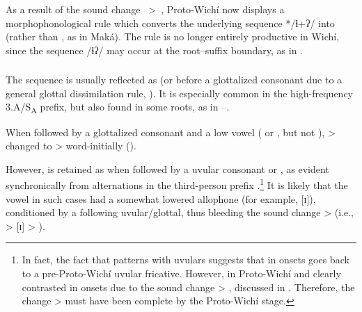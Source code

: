 As a result of the sound change ~>~, Proto-Wichí now displays a morphophonological rule which converts the underlying sequence */ɬ+ʔ/ into  (rather than , as in Maká). The rule is no longer entirely productive in Wichí, since the sequence /ɬʔ/ may occur at the root--suffix boundary, as in .

\subsubsection{}\label{wi-yi}

The sequence  is usually reflected as  (or  before a glottalized consonant due to a general glottal dissimilation rule, ). It is especially common in the high-frequency 3.A/S\textsubscript{A} prefix, but also found in some roots, as in --.

\begin{exe}
    \ex \cutdown
    \ex \tell
    \ex \notafraid
    \ex \dew \label{wi-ji-dew}
    \ex \water \label{wi-ji-water}
    \ex \mancw \label{wi-ji-mancw}
    \ex \redv
    \ex \takeaway
    \ex \torn
    \ex \sendv
    \ex \feed
    \ex \withstand
    \ex \killv
    \ex \feel
    \ex \flee
    \ex \wash
    \ex \sleep
    \ex \bathe
    \ex \cook
    \ex \throwcw
    \ex \spillcw
    \ex \throwv
    \ex \burnvt
\end{exe}

When followed by a glottalized consonant and a low vowel ( or , but not ),  >  changed to  >  word-initially ().

\begin{exe}
    \ex \jaguar
    \ex \treen
    \ex \vulture
\end{exe}

However,  is retained as  when followed by a uvular consonant or , as evident synchronically from alternations in the third-person prefix \citep[241–242]{VN14}.\footnote{\label{prepwjj}In fact, the fact that  patterns with uvulars suggests that  in onsets goes back to a pre-Proto-Wichí uvular fricative. However, in Proto-Wichí  and  clearly contrasted in onsets due to the sound change  > , discussed in . Therefore, the change  >  must have been complete by the Proto-Wichí stage.} It is likely that the vowel  in such cases had a somewhat lowered allophone (for example, [ɪ]), conditioned by a following uvular/glottal, thus bleeding the sound change  >  (i.e.,  > [ɪ] > ).

